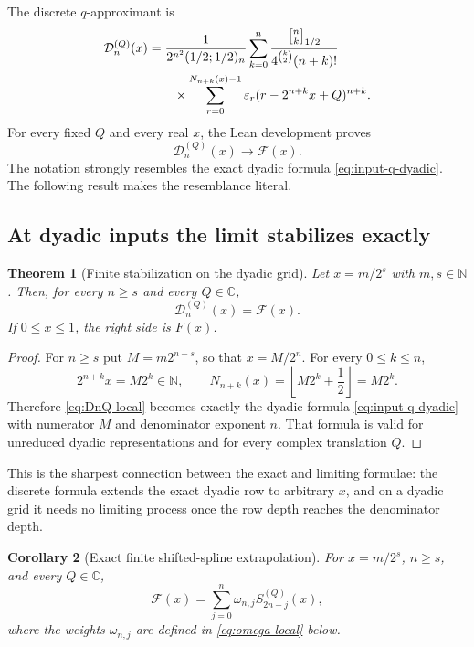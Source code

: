 \documentclass[11pt,oneside]{article}
\newtheorem{theorem}{Theorem}[section]
\newtheorem{corollary}[theorem]{Corollary}
\theoremstyle{definition}
\theoremstyle{remark}
\newcommand{\C}{\mathbb C}
\newcommand{\N}{\mathbb N}
\newcommand{\qbinom}[3]{\genfrac{[}{]}{0pt}{}{#1}{#2}_{#3}}
\newcommand{\tm}{\varepsilon}
\begin{document}
The discrete $q$-approximant is
\begin{align}
 \mathcal D_n^{(Q)}(x)
 &=\frac1{2^{n^2}(1/2;1/2)_n}
 \sum_{k=0}^{n}
 \frac{\qbinom nk{1/2}}{4^{\binom k2}(n+k)!}             \notag\\
 &\qquad\times
 \sum_{r=0}^{N_{n+k}(x)-1}\tm_r
       (r-2^{n+k}x+Q)^{n+k}.                              \label{eq:DnQ-local}
\end{align}
For every fixed $Q$ and every real $x$, the Lean development proves
\begin{equation}
 \mathcal D_n^{(Q)}(x)\longrightarrow\mathcal F(x).       \label{eq:DnQ-limit-local}
\end{equation}
The notation strongly resembles the exact dyadic formula
\eqref{eq:input-q-dyadic}.  The following result makes the resemblance literal.

\subsection{At dyadic inputs the limit stabilizes exactly}

\begin{theorem}[Finite stabilization on the dyadic grid]
\label{thm:dyadic-stabilization}
Let $x=m/2^s$ with $m,s\in\N$.  Then, for every $n\ge s$ and every $Q\in\C$,
\begin{equation}
 \boxed{\mathcal D_n^{(Q)}(x)=\mathcal F(x).}              \label{eq:dyadic-stabilization}
\end{equation}
If $0\le x\le1$, the right side is $F(x)$.
\end{theorem}

\begin{proof}
For $n\ge s$ put $M=m2^{n-s}$, so that $x=M/2^n$.  For every $0\le k\le n$,
\[
 2^{n+k}x=M2^k\in\N,
 \qquad
 N_{n+k}(x)=\left\lfloor M2^k+\frac12\right\rfloor=M2^k.
\]
Therefore \eqref{eq:DnQ-local} becomes exactly the dyadic formula
\eqref{eq:input-q-dyadic} with numerator $M$ and denominator exponent $n$.  That formula is
valid for unreduced dyadic representations and for every complex translation $Q$.
\end{proof}

This is the sharpest connection between the exact and limiting formulae: the discrete formula
extends the exact dyadic row to arbitrary $x$, and on a dyadic grid it needs no limiting
process once the row depth reaches the denominator depth.

\begin{corollary}[Exact finite shifted-spline extrapolation]
\label{cor:exact-shifted-extrapolation}
For $x=m/2^s$, $n\ge s$, and every $Q\in\C$,
\begin{equation}
 \mathcal F(x)=\sum_{j=0}^{n}\omega_{n,j}
 S_{2n-j}^{(Q)}(x),                                       \label{eq:exact-shifted-extrapolation}
\end{equation}
where the weights $\omega_{n,j}$ are defined in
\eqref{eq:omega-local} below.
\end{corollary}
\end{document}
